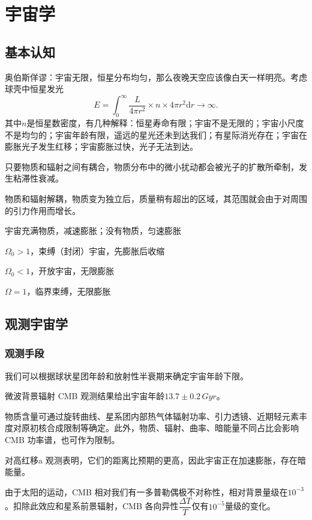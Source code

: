 \documentclass[../天体物理基础.tex]{subfiles}
\begin{document}
\section{宇宙学}
\subsection{基本认知}
奥伯斯佯谬：宇宙无限，恒星分布均匀，那么夜晚天空应该像白天一样明亮。考虑球壳中恒星发光
\begin{equation}
E=\int_{0}^{\infty}\frac{L}{4\pi r^{2}}\times n\times4\pi r^{2}\mathrm{d}r\to\infty.
\end{equation}
其中$n$是恒星数密度，有几种解释：恒星寿命有限；宇宙不是无限的；宇宙小尺度不是均匀的；宇宙年龄有限，遥远的星光还未到达我们；有星际消光存在；宇宙在膨胀光子发生红移；宇宙膨胀过快，光子无法到达。

只要物质和辐射之间有耦合，物质分布中的微小扰动都会被光子的扩散所牵制，发生粘滞性衰减。

物质和辐射解耦，物质变为独立后，质量稍有超出的区域，其范围就会由于对周围的引力作用而增长。


宇宙充满物质，减速膨胀；没有物质，匀速膨胀

$\Omega_{0}>1$，束缚（封闭）宇宙，先膨胀后收缩

$\Omega_{0}<1$，开放宇宙，无限膨胀

$\Omega=1$，临界束缚，无限膨胀

\subsection{观测宇宙学}
\subsubsection{观测手段}
我们可以根据球状星团年龄和放射性半衰期来确定宇宙年龄下限。

微波背景辐射 CMB 观测结果给出宇宙年龄$13.7\pm0.2\,\unit{Gyr}$。

物质含量可通过旋转曲线、星系团内部热气体辐射功率、引力透镜、近期轻元素丰度对原初核合成限制等确定。此外，物质、辐射、曲率、暗能量不同占比会影响 CMB 功率谱，也可作为限制。

对高红移\uppercase\expandafter{}a 观测表明，它们的距离比预期的更高，因此宇宙正在加速膨胀，存在暗能量。

由于太阳的运动，CMB 相对我们有一多普勒偶极不对称性，相对背景量级在$10^{-3}$。扣除此效应和星系前景辐射，CMB 各向异性$\dfrac{\Delta{}T}{T}$仅有$10^{-5}$量级的变化。
\end{document}
